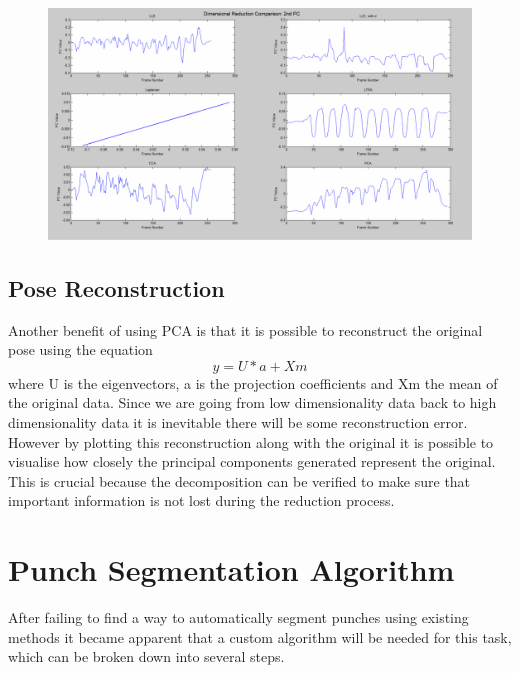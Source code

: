 \begin{figure}[h!]
    \centering
    \includegraphics[height=0.25\textheight]{fig04/drcomp2.pdf}
    \label{fig:drcomp}
\end{figure}\clearpage


\subsection{Pose Reconstruction}
Another benefit of using PCA is that it is possible to reconstruct the original pose using the equation $$y = U*a+Xm$$ where U is the eigenvectors, a is the projection coefficients and Xm the mean of the original data. Since we are going from low dimensionality data back to high dimensionality data it is inevitable there will be some reconstruction error. However by plotting this reconstruction along with the original it is possible to visualise how closely the principal components generated represent the original. This is crucial because the decomposition can be verified to make sure that important information is not lost during the reduction process.\qquad

\section{Punch Segmentation Algorithm}
After failing to find a way to automatically segment punches using existing methods it became apparent that a custom algorithm will be needed for this task, which can be broken down into several steps.

